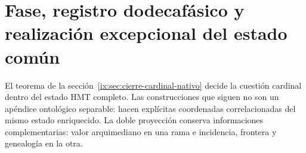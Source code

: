 \section{Fase, registro dodecafásico y realización excepcional del estado común}
\label{ix:sec:testigos-descendentes-ch}

El teorema de la sección~\ref{ix:sec:cierre-cardinal-nativo} decide la cuestión
cardinal dentro del estado HMT completo. Las construcciones que siguen no son
un apéndice ontológico separable: hacen explícitas coordenadas correlacionadas
del mismo estado enriquecido. La doble proyección conserva informaciones
complementarias: valor arquimediano en una rama e incidencia, frontera y
genealogía en la otra.

